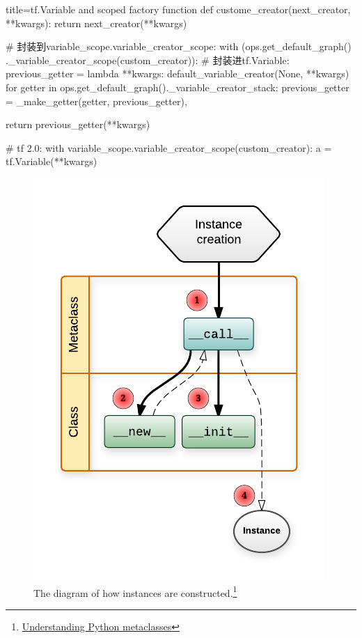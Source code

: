 \begin{frame}[fragile]
    \begin{tcblisting}{title=tf.Variable and scoped factory function}
        def custome_creator(next_creator, **kwargs):
          return next_creator(**kwargs)

        # 封装到variable_scope.variable_creator_scope:
        with (ops.get_default_graph()
                 ._variable_creator_scope(custom_creator)):
          # 封装进tf.Variable:
          previous_getter = lambda **kwargs: default_variable_creator(None, **kwargs)
          for getter in ops.get_default_graph()._variable_creator_stack:
            previous_getter = _make_getter(getter, previous_getter),

          return previous_getter(**kwargs)

        # tf 2.0:
        with variable_scope.variable_creator_scope(custom_creator):
          a = tf.Variable(**kwargs)
    \end{tcblisting}
\end{frame}

\begin{frame}
    \begin{figure}[!tb]
        \includegraphics[width=0.7\onepicwidth]{figure/var/instance-creation}
        \caption{The diagram of how instances are constructed.\footnote{
                 \href{https://blog.ionelmc.ro/2015/02/09/understanding-python-metaclasses/}{Understanding Python metaclasses}}}
    \end{figure}
\end{frame}

